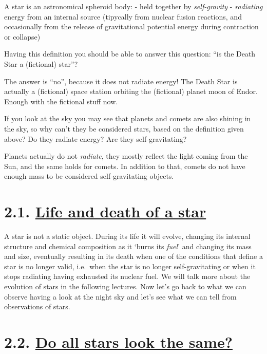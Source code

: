 \documentclass[
  letterpaper,
  DIV=11,
  numbers=noendperiod]{scrreprt}
\begin{document}
A star is an astronomical spheroid body: - held together by
\emph{self-gravity} - \emph{radiating} energy from an internal source
(tipycally from nuclear fusion reactions, and occasionally from the
release of gravitational potential energy during contraction or
collapse)

Having this definition you should be able to answer this question: ``is
the Death Star a (fictional) star''?

The answer is ``no'', because it does not radiate energy! The Death Star
is actually a (fictional) space station orbiting the (fictional) planet
moon of Endor. Enough with the fictional stuff now.

If you look at the sky you may see that planets and comets are also
shining in the sky, so why can't they be considered stars, based on the
definition given above? Do they radiate energy? Are they
self-gravitating?

Planets actually do not \emph{radiate}, they mostly reflect the light
coming from the Sun, and the same holds for comets. In addition to that,
comets do not have enough mass to be considered self-gravitating
objects.

\hypertarget{life-and-death-of-a-star-1}{%
\section*{\texorpdfstring{2.1. \protect\hyperlink{toc0_}{Life and death
of a
star}}{2.1. Life and death of a star}}\label{life-and-death-of-a-star-1}}


A star is not a static object. During its life it will evolve, changing
its internal structure and chemical composition as it `burns its
\emph{fuel}' and changing its mass and size, eventually resulting in its
death when one of the conditions that define a star is no longer valid,
i.e.~when the star is no longer self-gravitating or when it stops
radiating having exhausted its nuclear fuel. We will talk more about the
evolution of stars in the following lectures. Now let's go back to what
we can observe having a look at the night sky and let's see what we can
tell from observations of stars.

\hypertarget{do-all-stars-look-the-same-1}{%
\section*{\texorpdfstring{2.2. \protect\hyperlink{toc0_}{Do all stars
look the
same?}}{2.2. Do all stars look the same?}}\label{do-all-stars-look-the-same-1}}
\end{document}
